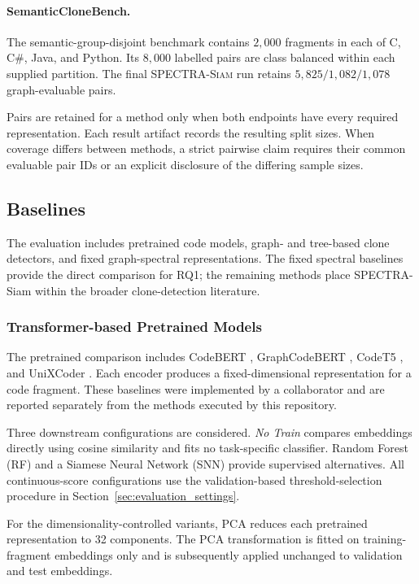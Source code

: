 \documentclass[authoryear,final,5p,times,twocolumn]{elsarticle}
\newcommand{\method}{\textsc{SPECTRA-Siam}}
\theoremstyle{plain}
\begin{document}
\paragraph{SemanticCloneBench.}
The semantic-group-disjoint benchmark contains $2{,}000$ fragments in each
of C, C\#, Java, and Python. Its $8{,}000$ labelled pairs are class balanced
within each supplied partition. The final \method{} run retains
$5{,}825/1{,}082/1{,}078$ graph-evaluable pairs.

Pairs are retained for a method only when both endpoints have every required
representation. Each result artifact records the resulting split sizes. When
coverage differs between methods, a strict pairwise claim requires their common
evaluable pair IDs or an explicit disclosure of the differing sample sizes.

\subsection{Baselines}
\label{sec:baselines}

The evaluation includes pretrained code models, graph- and tree-based clone
detectors, and fixed graph-spectral representations. The fixed spectral
baselines provide the direct comparison for RQ1; the remaining methods place
SPECTRA-Siam within the broader clone-detection literature.


\subsubsection{Transformer-based Pretrained Models}
\label{sec:pretrained_baselines}

The pretrained comparison includes CodeBERT \cite{??},
GraphCodeBERT \cite{??}, CodeT5 \cite{??}, and UniXCoder \cite{??}.
Each encoder produces a fixed-dimensional representation for a code fragment.
These baselines were implemented by a collaborator and are reported separately
from the methods executed by this repository.

Three downstream configurations are considered. \emph{No Train} compares
embeddings directly using cosine similarity and fits no task-specific
classifier. Random Forest (RF) and a Siamese Neural Network (SNN) provide
supervised alternatives. All continuous-score configurations use the
validation-based threshold-selection procedure in
Section~\ref{sec:evaluation_settings}.

For the dimensionality-controlled variants, PCA reduces each pretrained
representation to 32 components. The PCA transformation is fitted on
training-fragment embeddings only and is subsequently applied unchanged to
validation and test embeddings.
\end{document}
